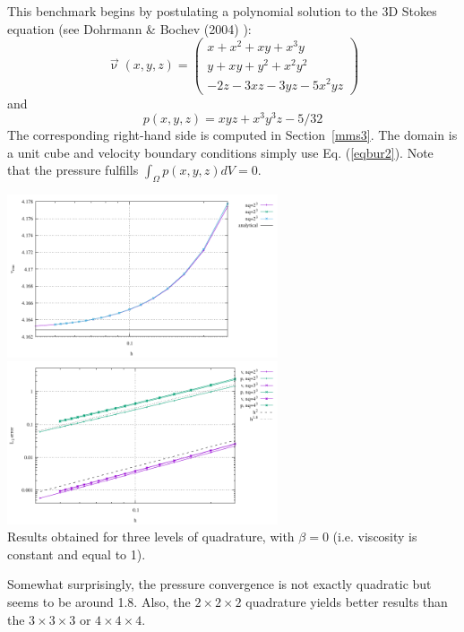 This benchmark begins by postulating a polynomial solution 
to the 3D Stokes equation (see Dohrmann \& Bochev (2004) \cite{dobo04}):
\begin{equation}
\vec{\upnu}(x,y,z)
=
\left(
\begin{array}{c}
x+x^2+xy+x^3y \\
y + xy + y^2 + x^2 y^2\\
-2z - 3xz - 3yz - 5x^2 yz
\end{array}
\right)
\label{eqbur2}
\end{equation}
and
\begin{equation}
p(x,y,z) = xyz + x^3 y^3z - 5/32
\end{equation}
The corresponding right-hand side is computed in Section~\ref{mms3}.
The domain is a unit cube and velocity boundary conditions
simply use Eq. (\ref{eqbur2}).
Note that the pressure fulfills $\int_\Omega p(x,y,z) dV = 0.$

\begin{center}
\includegraphics[width=8cm]{python_codes/fieldstone_82/results/bench1/vrms.pdf}
\includegraphics[width=8cm]{python_codes/fieldstone_82/results/bench1/conv.pdf}\\
{\captionfont Results obtained for three levels of quadrature, with $\beta=0$ (i.e.
viscosity is constant and equal to 1).}
\end{center}

Somewhat surprisingly, the pressure convergence is not exactly quadratic but seems to be
around 1.8. Also, the $2\times 2\times 2$ 
quadrature yields better results than the $3\times 3\times 3$ or $4\times 4 \times 4$.

